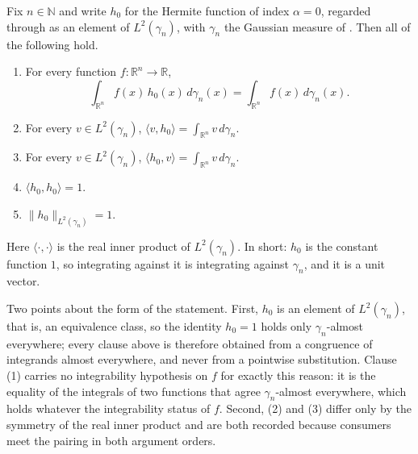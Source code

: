 \begin{lemma}
Fix $n \in \mathbb{N}$ and write $h_0$ for the Hermite function of index
$\alpha = 0$, regarded through  as an element of
$L^2(\gamma_n)$, with $\gamma_n$ the Gaussian measure of .
Then all of the following hold.
\begin{enumerate}
  \item For every function $f : \mathbb{R}^n \to \mathbb{R}$,
    \[
      \int_{\mathbb{R}^n} f(x)\, h_0(x) \, d\gamma_n(x)
        = \int_{\mathbb{R}^n} f(x) \, d\gamma_n(x) .
    \]
  \item For every $v \in L^2(\gamma_n)$,
    $\displaystyle \langle v, h_0\rangle
       = \int_{\mathbb{R}^n} v \, d\gamma_n$.
  \item For every $v \in L^2(\gamma_n)$,
    $\displaystyle \langle h_0, v\rangle
       = \int_{\mathbb{R}^n} v \, d\gamma_n$.
  \item $\langle h_0, h_0\rangle = 1$.
  \item $\|h_0\|_{L^2(\gamma_n)} = 1$.
\end{enumerate}
Here $\langle\cdot,\cdot\rangle$ is the real inner product of $L^2(\gamma_n)$.
In short: $h_0$ is the constant function $1$, so integrating against it is
integrating against $\gamma_n$, and it is a unit vector.

Two points about the form of the statement.  First, $h_0$ is an element of
$L^2(\gamma_n)$, that is, an equivalence class, so the identity $h_0 = 1$ holds
only $\gamma_n$-almost everywhere; every clause above is therefore obtained from
a congruence of integrands almost everywhere, and never from a pointwise
substitution.  Clause (1) carries no integrability hypothesis on $f$ for exactly
this reason: it is the equality of the integrals of two functions that agree
$\gamma_n$-almost everywhere, which holds whatever the integrability status of
$f$.  Second, (2) and (3) differ only by the symmetry of the real inner product
and are both recorded because consumers meet the pairing in both argument orders.
\end{lemma}
